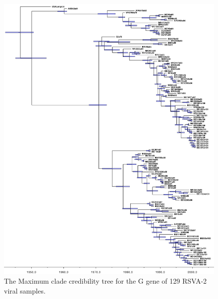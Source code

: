 \documentclass[12pt]{article}
\begin{document}
\begin{figure}

\includegraphics[width=\textwidth]{figures/RSV2_mcc_tree.pdf}

\caption{The Maximum clade credibility tree for the G gene of 129 RSVA-2 viral samples. }
\label{fig:RSV2tree}
\end{figure}
\end{document}
